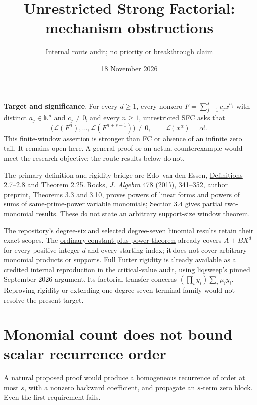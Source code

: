 \documentclass[11pt]{article}
\newcommand{\Lfac}{\mathcal L}
\begin{document}
\title{Unrestricted Strong Factorial: mechanism obstructions}
\author{Internal route audit; no priority or breakthrough claim}
\date{18 November 2026}
\maketitle

\noindent\textbf{Target and significance.}
For every $d\geq1$, every nonzero $F=\sum_{j=1}^s c_jx^{a_j}$
with distinct $a_j\in\mathbb N^d$ and $c_j\ne0$, and every $n\geq1$,
unrestricted SFC asks that
\[
  \bigl(\Lfac(F^n),\ldots,\Lfac(F^{n+s-1})\bigr)\ne0,
  \qquad \Lfac(x^\alpha)=\alpha!.
\]
This finite-window assertion is stronger than FC or absence of an
infinite zero tail. It remains open here. A general proof or an actual
counterexample would meet the research objective; the route results
below do not.

The primary definition and rigidity bridge are Edo--van den Essen,
\href{https://arxiv.org/abs/1304.3956v2}{Definitions 2.7--2.8 and
Theorem 2.25}. Rocks, \emph{J. Algebra} 478 (2017), 341--352,
\href{https://people.math.sc.edu/rocks/BradyRocksSFC2015.pdf}{author
preprint, Theorems 3.3 and 3.10}, proves powers of linear forms and
powers of sums of same-prime-power variable monomials; Section 3.4
gives partial two-monomial results. These do not state an arbitrary
support-size window theorem.

The repository's degree-six and selected degree-seven binomial results
retain their exact scopes.  The
\href{ALL_UNIVARIATE_TWO_TERM_SFC.tex}{ordinary constant-plus-power theorem}
already covers $A+BX^d$ for every positive integer $d$ and every starting
index; it does not cover arbitrary monomial products or supports. Full Furter rigidity is already available
as a credited internal reproduction in
\href{RIGIDITY_CRITICAL_VALUES.tex}{the critical-value audit}, using
liqsweep's pinned September 2026 argument. Its factorial transfer concerns
$(\prod_i y_i)\sum_i\mu_i y_i$. Reproving rigidity or extending one
degree-seven terminal family would not resolve the present target.

\section{Monomial count does not bound scalar recurrence order}
A natural proposed proof would produce a homogeneous recurrence of
order at most $s$, with a nonzero backward coefficient, and propagate
an $s$-term zero block. Even the first requirement fails.
\end{document}
